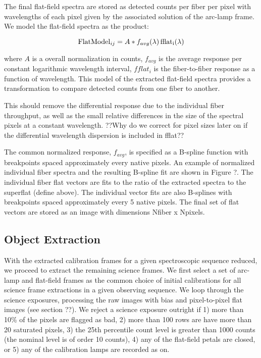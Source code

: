\documentclass[12pt,preprint]{aastex}
\begin{document}
The final flat-field spectra are stored as 
detected counts per fiber per pixel with wavelengths of each pixel
given by the associated solution of the arc-lamp frame.  
We model the flat-field spectra as the product:


\begin{equation} 
{\rm Flat Model}_{ij} = A * f_{avg}(\lambda) \, {\rm fflat_i} (\lambda) 
\end{equation} 

where $A$ is a overall normalization in counts, 
$f_{avg}$ is the average response per constant logarithmic wavelength
interval, $fflat_i$ is the fiber-to-fiber response as a function of wavelength.
This model of the extracted flat-field spectra provides a transformation to
compare detected counts from one fiber to another.  

This should remove the differential response due to the individual fiber
throughput, as well as the small relative differences in the size of the
spectral pixels at a constant wavelength.  ??Why do we correct for pixel
sizes later on if the differential wavelength dispersion is included in fflat??

The common normalized response, $f_{avg}$, is specified as a B-spline
function with breakpoints spaced approximately every native pixels.
An example of normalized individual fiber spectra 
and the resulting B-spline fit are shown in Figure ?.  The individual fiber
flat vectors are fits to the ratio of the extracted spectra to the superflat
(define above).  The individual vector fits are also B-splines with breakpoints
spaced approximately every 5 native pixels.  The final set of flat vectors are
stored as an image with dimensions Nfiber x Npixels.


\subsection{Object Extraction}

With the extracted calibration frames for a given spectroscopic sequence
reduced, we proceed to extract the remaining science frames.
We first select a set of arc-lamp and flat-field frames as the common
choice of initial calibrations for all science frame extractions in a given
observing sequence.  We loop through the science exposures, processing the
raw images with bias and pixel-to-pixel flat images (see section ??).
We reject a science exposure outright if 1) more than 10\% of the pixels
are flagged as bad, 2) more than 100 rows are have more than 20 saturated
pixels, 3) the 25th
percentile count level is greater than 1000 counts (the nominal level
is of order 10 counts), 4) any of the flat-field petals are closed, or 5)
any of the calibration lamps are recorded as on.
\end{document}
